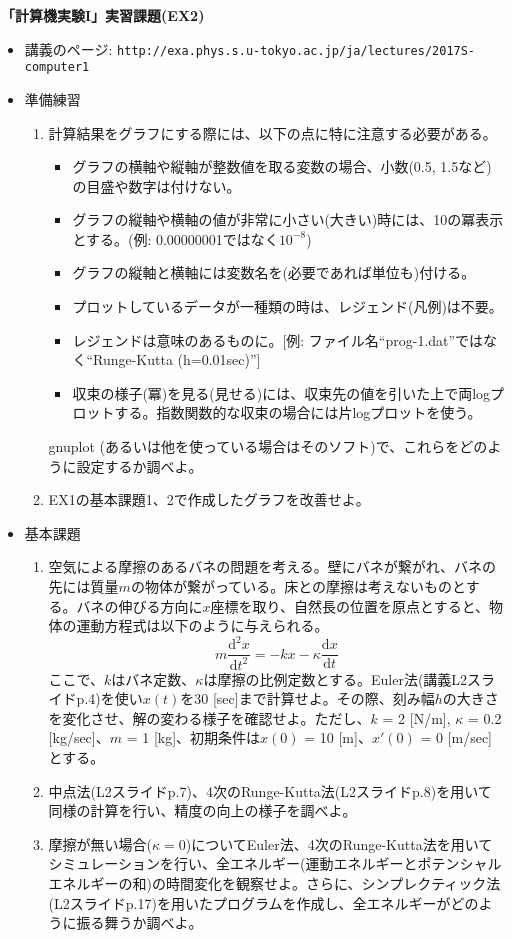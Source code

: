 \documentclass[11pt]{jarticle}
\begin{document}
\noindent
{\bf\large 「計算機実験I」実習課題(EX2)}
\\[-0.5em]

\noindent
\begin{itemize}
\item 講義のページ: \verb+http://exa.phys.s.u-tokyo.ac.jp/ja/lectures/2017S-computer1+

\item 準備練習
  \begin{enumerate}
  \item 計算結果をグラフにする際には、以下の点に特に注意する必要がある。
    \begin{itemize}
    \item グラフの横軸や縦軸が整数値を取る変数の場合、小数(0.5, 1.5など)の目盛や数字は付けない。
    \item グラフの縦軸や横軸の値が非常に小さい(大きい)時には、10の冪表示とする。(例: 0.00000001ではなく$10^{-8}$)
    \item グラフの縦軸と横軸には変数名を(必要であれば単位も)付ける。
    \item プロットしているデータが一種類の時は、レジェンド(凡例)は不要。
    \item レジェンドは意味のあるものに。[例: ファイル名``prog-1.dat''ではなく``Runge-Kutta (h=0.01sec)'']
    \item 収束の様子(冪)を見る(見せる)には、収束先の値を引いた上で両logプロットする。指数関数的な収束の場合には片logプロットを使う。
    \end{itemize}
    gnuplot (あるいは他を使っている場合はそのソフト)で、これらをどのように設定するか調べよ。
  \item EX1の基本課題1、2で作成したグラフを改善せよ。
  \end{enumerate}

\item 基本課題
  \begin{enumerate}
  \item 空気による摩擦のあるバネの問題を考える。壁にバネが繋がれ、バネの先には質量$m$の物体が繋がっている。床との摩擦は考えないものとする。バネの伸びる方向に$x$座標を取り、自然長の位置を原点とすると、物体の運動方程式は以下のように与えられる。
    \[
    m\frac{\mathrm{d} ^2x}{\mathrm{d} t^2} = -kx - \kappa \frac{\mathrm{d} x}{\mathrm{d} t} 
    \]
    ここで、$k$はバネ定数、$\kappa$は摩擦の比例定数とする。Euler法(講義L2スライドp.4)を使い$x(t)$を30 [sec]まで計算せよ。その際、刻み幅$h$の大きさを変化させ、解の変わる様子を確認せよ。ただし、$k$ = 2 [N/m], $\kappa$ = 0.2 [kg/sec]、$m$ = 1 [kg]、初期条件は$x(0)$ = 10 [m]、$x'(0)$ = 0 [m/sec] とする。
  \item 中点法(L2スライドp.7)、4次のRunge-Kutta法(L2スライドp.8)を用いて同様の計算を行い、精度の向上の様子を調べよ。
  \item 摩擦が無い場合($\kappa=0$)についてEuler法、4次のRunge-Kutta法を用いてシミュレーションを行い、全エネルギー(運動エネルギーとポテンシャルエネルギーの和)の時間変化を観察せよ。さらに、シンプレクティック法(L2スライドp.17)を用いたプログラムを作成し、全エネルギーがどのように振る舞うか調べよ。
  \end{enumerate}
  

\end{itemize}
\end{document}
